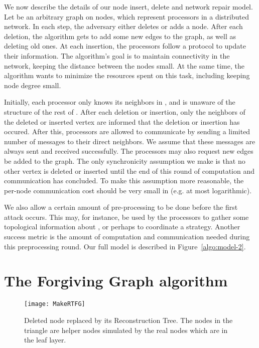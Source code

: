 \documentclass[11pt, letter]{article}
\begin{document}
We now describe the details of our node insert, delete and network repair model.  Let  be an arbitrary graph on
 nodes,
which represent processors in a distributed network.  In each step, the adversary either deletes or adds a node. 
After each
deletion, the algorithm gets to add some new edges to the graph, as well as deleting old ones.  At each insertion, the
processors follow a protocol to update their information.
The algorithm's goal is to maintain connectivity in the network, keeping the distance between the nodes small.  At the
same time, the algorithm wants to
minimize the resources spent on this task, including keeping node degree small.  



Initially, each processor only knows its neighbors in , and is unaware of the structure of the rest of .
After each deletion or insertion, only the neighbors of the deleted or inserted vertex are informed that
the deletion or insertion has occured. After this, processors are allowed to communicate by sending a limited number
of messages to their direct  neighbors.  We assume that these messages are always sent and received successfully.  The
processors may also request new edges be added to the graph. The only synchronicity assumption we make is that no
other  vertex is deleted or inserted until the end of this round of computation and communication has concluded.
To make this assumption more reasonable, the per-node communication cost should be very small in  (e.g. at most logarithmic).


We also allow a certain amount of pre-processing to be done before the first attack occurs.  This may, for instance,
be used by the processors to gather some topological information about , or perhaps to 
coordinate a strategy.  Another success metric is the amount of computation and communication needed during this
preprocessing round.  Our full model is described in Figure~\ref{algo:model-2}.



\section{The Forgiving Graph algorithm}
\label{sec:algorithm}

\begin{figure}[t!]
\centering
\texttt{[image: MakeRTFG]}
\caption{Deleted node  replaced by its Reconstruction Tree. The nodes in the triangle are helper nodes
simulated by the real nodes which are in the leaf layer.}
 \label{fig: RT}
\end{figure}
\end{document}
